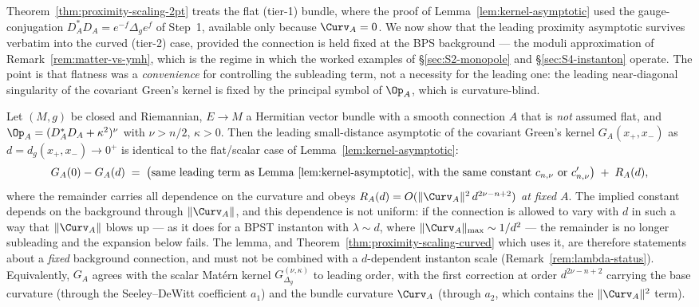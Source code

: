 Theorem~\ref{thm:proximity-scaling-2pt} treats the flat (tier-1)
bundle, where the proof of Lemma~\ref{lem:kernel-asymptotic} used the
gauge-conjugation $D_A^*D_A=e^{-f}\Delta_g e^f$ of Step~1, available
only because $\Curv_A=0$. We now show that the leading proximity
asymptotic survives verbatim into the curved (tier-2) case, provided
the connection is held fixed at the BPS background --- the moduli
approximation of Remark~\ref{rem:matter-vs-ymh}, which is the regime
in which the worked examples of \S\ref{sec:S2-monopole} and
\S\ref{sec:S4-instanton} operate. The point is that flatness was a
\emph{convenience} for controlling the subleading term, not a
necessity for the leading one: the leading near-diagonal singularity
of the covariant Green's kernel is fixed by the principal symbol of
$\Op_A$, which is curvature-blind.

\begin{lemma}
\label{lem:kernel-asymptotic-curved}
Let $(M,g)$ be closed and Riemannian, $E\to M$ a Hermitian vector
bundle with a smooth connection $A$ that is \emph{not} assumed flat,
and $\Op_A=(D_A^*D_A+\kappa^2)^\nu$ with $\nu>n/2$, $\kappa>0$. Then
the leading small-distance asymptotic of the covariant Green's kernel
$G_A(x_+,x_-)$ as $d=d_g(x_+,x_-)\to 0^+$ is identical to the
flat/scalar case of Lemma~\ref{lem:kernel-asymptotic}:
\[
   G_A(0)-G_A(d) \;=\; \big(\text{same leading term as
   Lemma~\ref{lem:kernel-asymptotic}, with the same constant }
   c_{n,\nu}\text{ or }c_{n,\nu}'\big) \;+\; R_A(d),
\]
where the remainder carries all dependence on the curvature and obeys
$R_A(d)=O(\|\Curv_A\|^2\,d^{2\nu-n+2})$ \emph{at fixed $A$}.
The implied constant depends on the background through
$\|\Curv_A\|$, and this dependence is not uniform: if the connection
is allowed to vary with $d$ in such a way that $\|\Curv_A\|$ blows up
--- as it does for a BPST instanton with $\lambda\sim d$, where
$\|\Curv_A\|_{\max}\sim 1/d^2$ --- the remainder is no longer
subleading and the expansion below fails. The lemma, and
Theorem~\ref{thm:proximity-scaling-curved} which uses it, are
therefore statements about a \emph{fixed} background connection, and
must not be combined with a $d$-dependent instanton scale
(Remark~\ref{rem:lambda-status}). Equivalently, $G_A$ agrees with the scalar
Mat\'ern kernel $G^{(\nu,\kappa)}_{\Delta_g}$ to leading order, with
the first correction at order $d^{2\nu-n+2}$ carrying the base
curvature (through the Seeley--DeWitt coefficient $a_1$) and the
bundle curvature $\Curv_A$ (through $a_2$, which contains the
$\|\Curv_A\|^2$ term).
\end{lemma}

